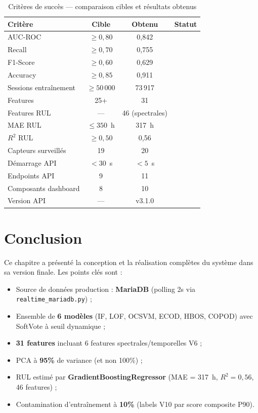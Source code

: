 \documentclass[12pt,a4paper]{report}
\newcommand{\cmark}{\ding{51}}
\begin{document}
\begin{table}[h]
\centering
\caption{Critères de succès — comparaison cibles et résultats obtenus}
\begin{tabular}{lccc}
\toprule
\textbf{Critère} & \textbf{Cible} & \textbf{Obtenu} & \textbf{Statut} \\
\midrule
AUC-ROC              & $\geq 0{,}80$  & 0,842   & \cmark \\
Recall               & $\geq 0{,}70$  & 0,755   & \cmark \\
F1-Score             & $\geq 0{,}60$  & 0,629   & \cmark \\
Accuracy             & $\geq 0{,}85$  & 0,911   & \cmark \\
Sessions entraînement & $\geq 50\,000$ & 73\,917 & \cmark \\
Features              & 25+            & 31      & \cmark \\
Features RUL          & —              & 46 (spectrales) & \cmark \\
MAE RUL              & $\leq 350$~h   & 317~h   & \cmark \\
$R^2$ RUL            & $\geq 0{,}50$  & 0,56    & \cmark \\
Capteurs surveillés   & 19             & 20      & \cmark \\
Démarrage API        & $< 30$~s       & $< 5$~s & \cmark \\
Endpoints API         & 9              & 11      & \cmark \\
Composants dashboard  & 8              & 10      & \cmark \\
Version API           & —              & v3.1.0  & \cmark \\
\bottomrule
\end{tabular}
\end{table}

\section{Conclusion}

Ce chapitre a présenté la conception et la réalisation complètes du système dans sa
version finale. Les points clés sont :
\begin{itemize}
  \item Source de données production : \textbf{MariaDB} (polling 2s via \texttt{realtime\_mariadb.py}) ;
  \item Ensemble de \textbf{6 modèles} (IF, LOF, OCSVM, ECOD, HBOS, COPOD) avec SoftVote à seuil dynamique ;
  \item \textbf{31 features} incluant 6 features spectrales/temporelles V6 ;
  \item PCA à \textbf{95\%} de variance (et non 100\%) ;
  \item RUL estimé par \textbf{GradientBoostingRegressor} (MAE = 317~h, $R^2 = 0{,}56$, 46 features) ;
  \item Contamination d'entraînement à \textbf{10\%} (labels V10 par score composite P90).
\end{itemize}
\end{document}
